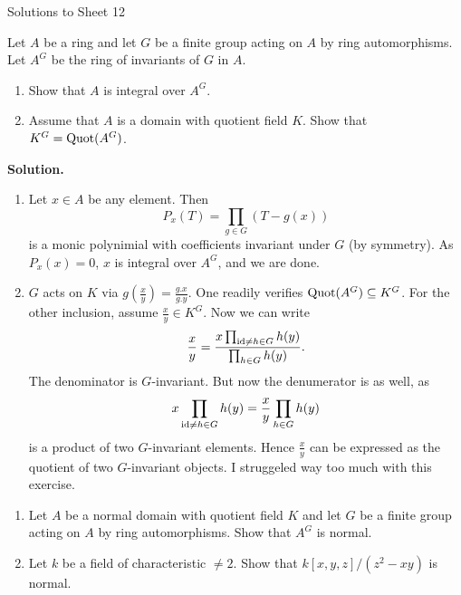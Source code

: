 \documentclass[a4paper,11pt]{article}
\begin{document}
\begin{center}
    \huge{Solutions to Sheet 12}
\end{center}

Let $A$ be a ring and let $G$ be a finite group acting on $A$ by ring automorphisms.
Let $A^G$ be the ring of invariants of $G$ in $A$.
\begin{enumerate}
    \item Show that $A$ is integral over $A^G$.
    \item Assume that $A$ is a domain with quotient field $K$. Show that $K^G = 
        \mathrm{Quot}(A^G)$. 
\end{enumerate}
\textbf{Solution.}
\begin{enumerate}
    \item Let $x \in A$ be any element. Then 
        \begin{equation*}
            P_x(T) = \prod_{g \in G}(T-g(x))
        \end{equation*}
        is a monic polynimial with coefficients invariant under $G$ (by symmetry). 
        As $P_x(x) = 0$, $x$ is integral over $A^G$, and we are done.
    \item $G$ acts on $K$ via $g (\frac xy) = \frac{g.x}{g.y}$. One readily 
        verifies $\mathrm{Quot}(A^G) \subseteq K^G$. For the other inclusion, assume 
        $\frac xy \in K^G$. Now we can write
        \begin{equation*}
            \frac {x}{y} = \frac {x\prod_{\operatorname{id} \neq h \in G} h(y)}{\prod_{h
                \in G} h(y)}.
        \end{equation*}
        The denominator is $G$-invariant. But now the denumerator is as well, as
        \begin{equation*}
            x \prod_{\operatorname{id} \neq h \in G} h(y) = \frac xy \prod_{h \in G} h(y)
        \end{equation*}
        is a product of two $G$-invariant elements. Hence $\frac xy$ can be expressed
        as the quotient of two $G$-invariant objects. I struggeled way too much with this
        exercise.
\end{enumerate}

\begin{enumerate}
    \item Let $A$ be a normal domain with quotient field $K$ and let $G$ be a
        finite group acting on $A$ by ring automorphisms. Show that $A^G$ is
        normal.
    \item Let $k$ be a field of characteristic $\neq 2$. Show that
        $k[x,y,z]/(z^2 - xy)$ is normal. 
\end{enumerate}
\end{document}
